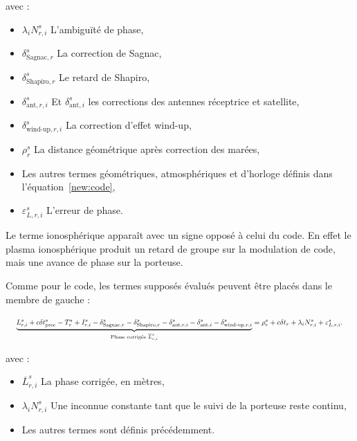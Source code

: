 avec :

\begin{itemize}
    \item $\lambda_i N_{r,i}^s$ L'ambiguïté de phase,
    \item $\delta_{\mathrm{Sagnac},r}^s$ La correction de Sagnac,
    \item $\delta_{\mathrm{Shapiro},r}^s$ Le retard de Shapiro,
    \item $\delta_{\mathrm{ant},r,i}^s$ Et $\delta_{\mathrm{ant},i}^s$
    les corrections des antennes réceptrice et satellite,
    \item $\delta_{\mathrm{wind\text{-}up},r,i}^s$ La correction d'effet wind-up,
    \item $\rho_r^s$ La distance géométrique après correction des marées,
    \item Les autres termes géométriques, atmosphériques et d'horloge
    définis dans l'équation~\eqref{new:code},
    \item $\varepsilon_{L,r,i}^s$ L'erreur de phase.
\end{itemize}

Le terme ionosphérique apparaît avec un signe opposé à celui du code. En effet le plasma
ionosphérique produit un retard de groupe sur la modulation de code, mais une
avance de phase sur la porteuse.

Comme pour le code, les termes supposés évalués peuvent être placés dans le
membre de gauche :

\begin{equation}
\resizebox{0.98\textwidth}{!}{$\displaystyle
\underbrace{
L_{r,i}^s+c\delta t_{\mathrm{prec}}^s-T_r^s+I_{r,i}^s
-\delta_{\mathrm{Sagnac},r}^s-\delta_{\mathrm{Shapiro},r}^s
-\delta_{\mathrm{ant},r,i}^s-\delta_{\mathrm{ant},i}^s
-\delta_{\mathrm{wind\text{-}up},r,i}^s
}_{\text{Phase corrigée }\overline L_{r,i}^s}
=\rho_r^s+c\delta t_r+\lambda_i N_{r,i}^s+\varepsilon_{L,r,i}^s.
$}
\label{eq:phase_corrigee}
\end{equation}

avec :

\begin{itemize}
    \item $\overline L_{r,i}^s$ La phase corrigée, en mètres,
    \item $\lambda_i N_{r,i}^s$ Une inconnue constante tant que le suivi de la porteuse
    reste continu,
    \item Les autres termes sont définis précédemment.
\end{itemize}

